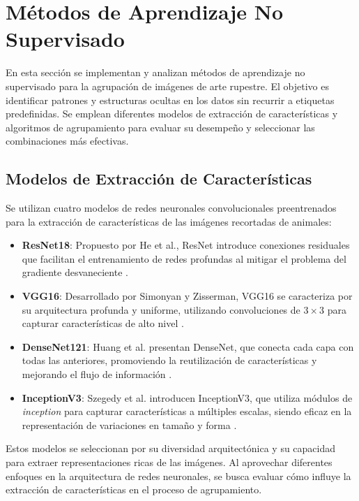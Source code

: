 \section{Métodos de Aprendizaje No Supervisado}

En esta sección se implementan y analizan métodos de aprendizaje no supervisado para la agrupación de imágenes de arte rupestre.
El objetivo es identificar patrones y estructuras ocultas en los datos sin recurrir a etiquetas predefinidas. Se emplean diferentes modelos de extracción de características y algoritmos de agrupamiento para evaluar su desempeño y seleccionar las combinaciones más efectivas.

\subsection{Modelos de Extracción de Características}

Se utilizan cuatro modelos de redes neuronales convolucionales preentrenados para la extracción de características de las imágenes recortadas de animales:

\begin{itemize}
    \item \textbf{ResNet18}: Propuesto por He et al., ResNet introduce conexiones residuales que facilitan el entrenamiento de redes profundas al mitigar el problema del gradiente desvaneciente \cite{he2016deep}.
    \item \textbf{VGG16}: Desarrollado por Simonyan y Zisserman, VGG16 se caracteriza por su arquitectura profunda y uniforme, utilizando convoluciones de $3 \times 3$ para capturar características de alto nivel \cite{simonyan2014very}.
    \item \textbf{DenseNet121}: Huang et al. presentan DenseNet, que conecta cada capa con todas las anteriores, promoviendo la reutilización de características y mejorando el flujo de información \cite{huang2017densely}.
    \item \textbf{InceptionV3}: Szegedy et al. introducen InceptionV3, que utiliza módulos de \textit{inception} para capturar características a múltiples escalas, siendo eficaz en la representación de variaciones en tamaño y forma \cite{szegedy2016rethinking}.
\end{itemize}

Estos modelos se seleccionan por su diversidad arquitectónica y su capacidad para extraer representaciones ricas de las imágenes.
Al aprovechar diferentes enfoques en la arquitectura de redes neuronales, se busca evaluar cómo influye la extracción de características en el proceso de agrupamiento.

